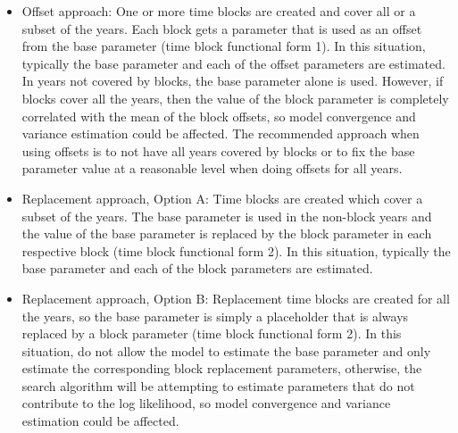 \begin{itemize}
	\item Offset approach: One or more time blocks are created and cover all or a subset of the years. Each block gets a parameter that is used as an offset from the base parameter (time block functional form 1). In this situation, typically the base parameter and each of the offset parameters are estimated. In years not covered by blocks, the base parameter alone is used.  However, if blocks cover all the years, then the value of the block parameter is completely correlated with the mean of the block offsets, so model convergence and variance estimation could be affected.  The recommended approach when using offsets is to not have all years covered by blocks or to fix the base parameter value at a reasonable level when doing offsets for all years.	
	
	\item Replacement approach, Option A: Time blocks are created which cover a subset of the years. The base parameter is used in the non-block years and the value of the base parameter is replaced by the block parameter in each respective block (time block functional form 2). In this situation, typically the base parameter and each of the block parameters are estimated.	
	
	\item Replacement approach, Option B: Replacement time blocks are created for all the years, so the base parameter is simply a placeholder that is always replaced by a block parameter (time block functional form 2). In this situation, do not allow the model to estimate the base parameter and only estimate the corresponding block replacement parameters, otherwise, the search algorithm will be attempting to estimate parameters that do not contribute to the log likelihood, so model convergence and variance estimation could be affected.
\end{itemize}


